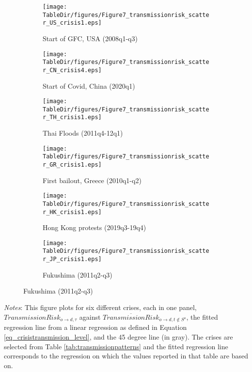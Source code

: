 \documentclass[12pt,oneside,leqno]{article}
\newcommand*{\TableDir}{.}
\begin{document}
\clearpage
\begin{figure}[!h]
\captionsetup{font=small}
\centering
\caption{Patterns of Transmission during Major Crises}\label{fig:crisis_transmission}
\begin{subfigure}[t]{0.35\textwidth}
\centering
\caption{Start of GFC, USA (2008q1-q3)}
\texttt{[image: \\TableDir/figures/Figure7\_transmissionrisk\_scatter\_US\_crisis1.eps]}
\end{subfigure}
\begin{subfigure}[t]{0.35\textwidth}
\centering
\caption{Start of Covid, China (2020q1)}
\texttt{[image: \\TableDir/figures/Figure7\_transmissionrisk\_scatter\_CN\_crisis4.eps]}
\end{subfigure}

\begin{subfigure}[t]{0.35\textwidth}
\centering
\caption{Thai Floods (2011q4-12q1)}
\texttt{[image: \\TableDir/figures/Figure7\_transmissionrisk\_scatter\_TH\_crisis1.eps]}
\end{subfigure}
\begin{subfigure}[t]{0.35\textwidth}
\centering
\caption{First bailout, Greece (2010q1-q2)}
\texttt{[image: \\TableDir/figures/Figure7\_transmissionrisk\_scatter\_GR\_crisis1.eps]}
\end{subfigure}

\begin{subfigure}[t]{0.35\textwidth}
\centering
\caption{Hong Kong protests (2019q3-19q4)}
\texttt{[image: \\TableDir/figures/Figure7\_transmissionrisk\_scatter\_HK\_crisis1.eps]}
\end{subfigure}
\begin{subfigure}[t]{0.35\textwidth}
\centering
\caption{Fukushima (2011q2-q3)}
\texttt{[image: \\TableDir/figures/Figure7\_transmissionrisk\_scatter\_JP\_crisis1.eps]}
\end{subfigure}
\end{figure}
\vspace{-.15in}
\begin{minipage}[!h]{.85\textwidth}
\footnotesize\textit{Notes}: This figure plots for six different crises, each in one panel, $\textit{TransmissionRisk}_{o\to d, \tau}$ against $\overline{\textit{TransmissionRisk}}_{o\to d, t\notin S^{o}}$, the fitted regression line from a linear regression as defined in Equation \ref{eq_crisistransmission_level}, and the 45 degree line (in gray). The crises are selected from Table \ref{tab:transmissionpatterns} and the fitted regression line corresponds to the regression on which the values reported in that table are based on.
\end{minipage}
\end{document}

